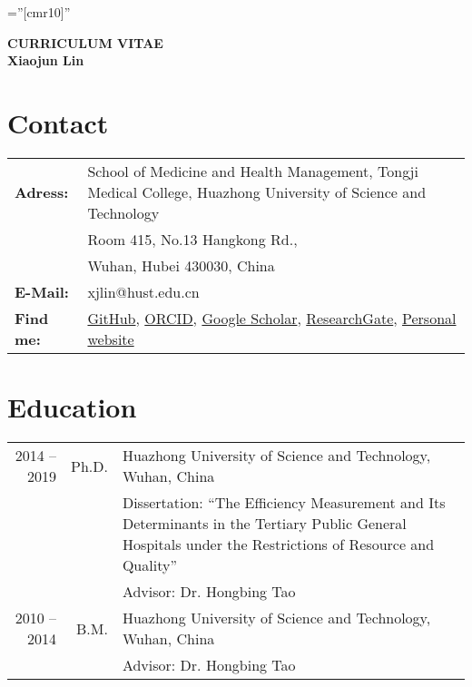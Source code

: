 \documentclass[a4paper,10pt]{article}
\begin{document}
\pagestyle{myheadings}

\font\fb=''[cmr10]'' %

\par{\centering
		{\LARGE \textbf{CURRICULUM VITAE}  \\
		\Large \textbf{Xiaojun Lin} \\
	}\bigskip\par}
	
\thispagestyle{empty} %
 
\section{Contact}
\begin{tabular}{l p{11.5cm}}
\textbf{Adress: } & School of Medicine and Health Management, Tongji Medical College, Huazhong University of Science and Technology\\ 
 				  & Room 415, No.13 Hangkong Rd., \\
 				  & Wuhan, Hubei 430030, China\\
\textbf{E-Mail: } & xjlin@hust.edu.cn\\

\textbf{Find me: } &
\href{https://github.com/xiaojunlin}{GitHub},
\href{https://orcid.org/0000-0003-4284-2401}{ORCID}, \href{https://scholar.google.com/citations?user=ZBGYTowAAAAJ&hl=zh-CN}{Google Scholar}, \href{https://www.researchgate.net/profile/Xiaojun_Lin2}{ResearchGate}, \href{https://xiaojunlin.github.io}{Personal website}
\end{tabular}

\section{Education}
\begin{tabular}{rr p{11cm}}
 2014 -- 2019 & Ph.D. & Huazhong University of Science and Technology, Wuhan, China \\
&& \small Dissertation: ``The Efficiency Measurement and Its Determinants in the Tertiary Public General Hospitals under the Restrictions of Resource and Quality''\\
&& \small Advisor: Dr. Hongbing Tao\\
 2010 -- 2014 & B.M. & Huazhong University of Science and Technology, Wuhan, China\\
&& \small Advisor: Dr. Hongbing Tao\\
\end{tabular}
\end{document}
